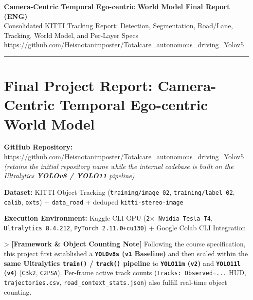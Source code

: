 \documentclass[10.5pt,a4paper]{article}
\begin{document}
\begin{center}
{\LARGE\bfseries Camera-Centric Temporal Ego-centric World Model Final Report (ENG)}\\[6pt]
{\normalsize\color{gray} Consolidated KITTI Tracking Report: Detection, Segmentation, Road/Lane, Tracking, World Model, and Per-Layer Specs}\\[4pt]
{\small\href{https://github.com/Heisnotanimposter/Totalcare_autonomous_driving_Yolov5}{https://github.com/Heisnotanimposter/Totalcare\_autonomous\_driving\_Yolov5}}
\end{center}
\vspace{4pt}
\hrule
\vspace{8pt}

\tableofcontents
\newpage
\section{Final Project Report: Camera-Centric Temporal Ego-centric World Model}

\textbf{GitHub Repository:} https:\allowbreak{}/\allowbreak{}/\allowbreak{}github.\allowbreak{}com/\allowbreak{}Heisnotanimposter/\allowbreak{}Totalcare\_\allowbreak{}autonomous\_\allowbreak{}driving\_\allowbreak{}Yolov5 \textit{(retains the initial repository name while the internal codebase is built on the Ultralytics \textbf{YOLOv8 / YOLO11} pipeline)}

\textbf{Dataset:} KITTI Object Tracking (\texttt{training/\allowbreak{}image\_\allowbreak{}02}, \texttt{training/\allowbreak{}label\_\allowbreak{}02}, \texttt{calib}, \texttt{oxts}) + \texttt{data\_\allowbreak{}road} + deduped \texttt{kitti-\allowbreak{}stereo-\allowbreak{}image}

\textbf{Execution Environment:} Kaggle CLI GPU (\texttt{2$\times$ Nvidia Tesla T4}, \texttt{Ultralytics 8.\allowbreak{}4.\allowbreak{}212}, \texttt{PyTorch 2.\allowbreak{}11.\allowbreak{}0+cu130}) + Google Colab CLI Integration


> \textbf{[Framework \& Object Counting Note]} Following the course specification, this project first established a \textbf{\texttt{YOLOv8s} (\texttt{v1} Baseline)} and then scaled within the \textbf{same Ultralytics \texttt{train()} / \texttt{track()} pipeline} to \textbf{\texttt{YOLO11m} (\texttt{v2})} and \textbf{\texttt{YOLO11l} (\texttt{v4})} (\texttt{C3k2}, \texttt{C2PSA}). Per-frame active track counts (\texttt{Tracks:\allowbreak{} Observed=.\allowbreak{}.\allowbreak{}.\allowbreak{}} HUD, \texttt{trajectories.\allowbreak{}csv}, \texttt{road\_\allowbreak{}context\_\allowbreak{}stats.\allowbreak{}json}) also fulfill real-time object counting.
\end{document}

